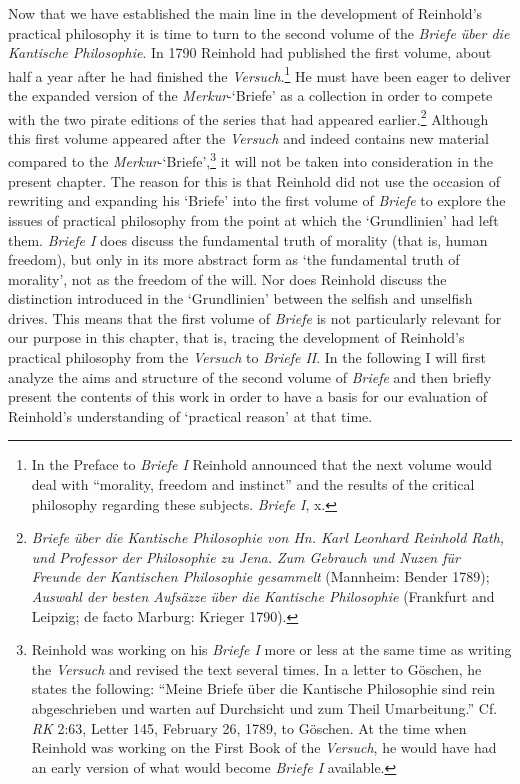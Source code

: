 Now that we have established the main line in the development of Reinhold's practical philosophy it is time to turn to the second volume of the \textit{Briefe \"{u}ber die Kantische Philosophie}. In 1790 Reinhold had published the first volume, about half a year after he had finished the \textit{Versuch}.\footnote{ In the Preface to \textit{Briefe I} Reinhold announced that the next volume would deal with ``morality, freedom and instinct'' and the results of the critical philosophy regarding these subjects. \textit{Briefe I}, x.} He must have been eager to deliver the expanded version of the \textit{Merkur}{-}`Briefe' as a collection in order to compete with the two pirate editions of the series that had appeared earlier.\footnote{ \textit{Briefe \"{u}ber die Kantische Philosophie von Hn. Karl Leonhard Reinhold Rath, und Professor der Philosophie zu Jena. Zum Gebrauch und Nuzen f\"{u}r Freunde der Kantischen Philosophie gesammelt} (Mannheim: Bender 1789);\textit{ Auswahl der besten Aufs\"{a}zze \"{u}ber die Kantische Philosophie} (Frankfurt and Leipzig; de facto Marburg: Krieger 1790).} Although this first volume appeared after the \textit{Versuch }and indeed contains new material compared to the \textit{Merkur}{-}`Briefe',\footnote{ Reinhold was working on his \textit{Briefe I }more or less at the same time as writing the \textit{Versuch} and revised the text several times. In a letter to G\"{o}schen, he states the following: ``Meine Briefe \"{u}ber die Kantische Philosophie sind rein abgeschrieben und warten auf Durchsicht und zum Theil Umarbeitung.'' Cf. \textit{RK} 2:63, Letter 145, February 26, 1789, to G\"{o}schen. At the time when Reinhold was working on the First Book of the \textit{Versuch}, he would have had an early version of what would become \textit{Briefe I} available.} it will not be taken into consideration in the present chapter. The reason for this is that Reinhold did not use the occasion of rewriting and expanding his `Briefe' into the first volume of \textit{Briefe }to explore the issues of practical philosophy from the point at which the `Grundlinien' had left them. \textit{Briefe I} does discuss the fundamental truth of morality (that is, human freedom), but only in its more abstract form as `the fundamental truth of morality', not as the freedom of the will. Nor does Reinhold discuss the distinction introduced in the `Grundlinien' between the selfish and unselfish drives. This means that the first volume of \textit{Briefe }is not particularly relevant for our purpose in this chapter, that is, tracing the development of Reinhold's practical philosophy from the \textit{Versuch} to \textit{Briefe II}. In the following I will first analyze the aims and structure of the second volume of \textit{Briefe} and then briefly present the contents of this work in order to have a basis for our evaluation of Reinhold's understanding of `practical reason' at that time. 


